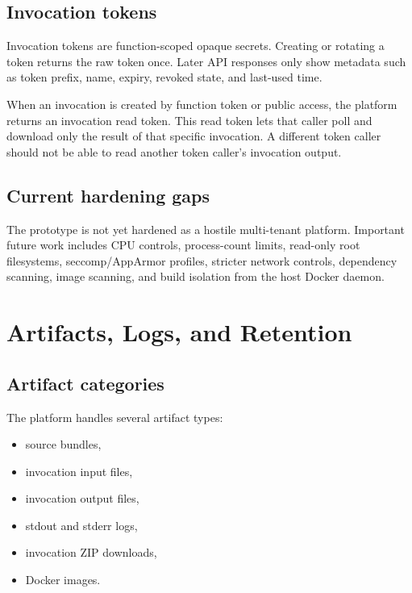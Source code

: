 \documentclass[12pt,a4paper]{report}
\begin{document}
\section{Invocation tokens}

Invocation tokens are function-scoped opaque secrets. Creating or rotating a
token returns the raw token once. Later API responses only show metadata such
as token prefix, name, expiry, revoked state, and last-used time.

When an invocation is created by function token or public access, the platform
returns an invocation read token. This read token lets that caller poll and
download only the result of that specific invocation. A different token caller
should not be able to read another token caller's invocation output.

\section{Current hardening gaps}

The prototype is not yet hardened as a hostile multi-tenant platform. Important
future work includes CPU controls, process-count limits, read-only root
filesystems, seccomp/AppArmor profiles, stricter network controls, dependency
scanning, image scanning, and build isolation from the host Docker daemon.

\clearpage

\chapter{Artifacts, Logs, and Retention}

\section{Artifact categories}

The platform handles several artifact types:

\begin{itemize}[leftmargin=1.2cm]
  \item source bundles,
  \item invocation input files,
  \item invocation output files,
  \item stdout and stderr logs,
  \item invocation ZIP downloads,
  \item Docker images.
\end{itemize}
\end{document}
